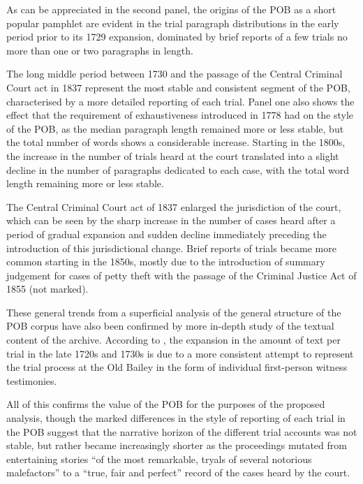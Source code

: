 As can be appreciated in the second panel, the origins of the POB as a short popular pamphlet are evident in the trial paragraph distributions in the early period prior to its 1729 expansion, dominated by brief reports of a few trials no more than one or two paragraphs in length.

The long middle period between 1730 and the passage of the Central Criminal Court act in 1837 represent the most stable and consistent segment of the POB, characterised by a more detailed reporting of each trial.
Panel one also shows the effect that the requirement of exhaustiveness introduced in 1778 had on the style of the POB, as the median paragraph length remained more or less stable, but the total number of words shows a considerable increase.
Starting in the 1800s, the increase in the number of trials heard at the court translated into a slight decline in the number of paragraphs dedicated to each case, with the total word length remaining more or less stable.

The Central Criminal Court act of 1837 enlarged the jurisdiction of the court, which can be seen by the sharp increase in the number of cases heard after a period of gradual expansion and sudden decline immediately preceding the introduction of this jurisdictional change.
Brief reports of trials became more common starting in the 1850s, mostly due to the introduction of summary judgement for cases of petty theft with the passage of the Criminal Justice Act of 1855 (not marked).

These general trends from a superficial analysis of the general structure of the POB corpus have also been confirmed by more in-depth study of the textual content of the archive.
According to \citet{huber2007}, the expansion in the amount of text per trial in the late 1720s and 1730s is due to a more consistent attempt to represent the trial process at the Old Bailey in the form of individual first-person witness testimonies.

All of this confirms the value of the POB for the purposes of the proposed analysis, though the marked differences in the style of reporting of each trial in the POB suggest that the narrative horizon of the different trial accounts was not stable, but rather became increasingly shorter as the proceedings mutated from entertaining stories ``of the most remarkable, tryals of several notorious malefactors'' to a ``true, fair and perfect'' record of the cases heard by the court.

